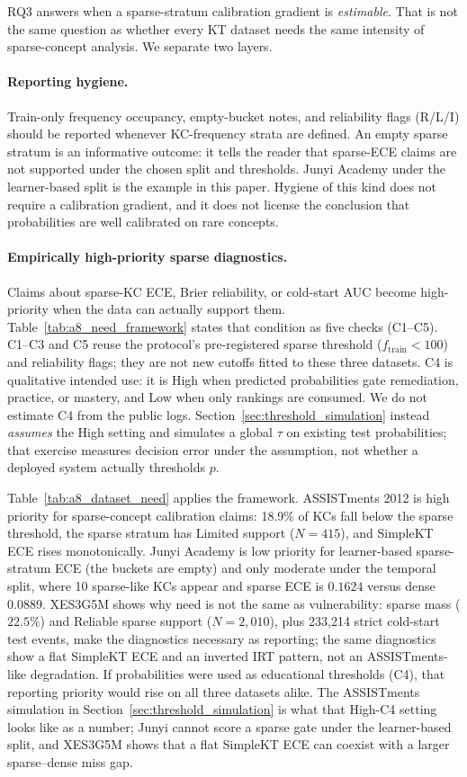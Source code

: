 RQ3 answers when a sparse-stratum calibration gradient is \emph{estimable}. That is not the same question as whether every KT dataset needs the same intensity of sparse-concept analysis. We separate two layers.

\paragraph{Reporting hygiene.}
Train-only frequency occupancy, empty-bucket notes, and reliability flags (R/L/I) should be reported whenever KC-frequency strata are defined. An empty sparse stratum is an informative outcome: it tells the reader that sparse-ECE claims are not supported under the chosen split and thresholds. Junyi Academy under the learner-based split is the example in this paper. Hygiene of this kind does not require a calibration gradient, and it does not license the conclusion that probabilities are well calibrated on rare concepts.

\paragraph{Empirically high-priority sparse diagnostics.}
Claims about sparse-KC ECE, Brier reliability, or cold-start AUC become high-priority when the data can actually support them. Table~\ref{tab:a8_need_framework} states that condition as five checks (C1--C5). C1--C3 and C5 reuse the protocol's pre-registered sparse threshold ($f_{\mathrm{train}}<100$) and reliability flags; they are not new cutoffs fitted to these three datasets. C4 is qualitative intended use: it is High when predicted probabilities gate remediation, practice, or mastery, and Low when only rankings are consumed. We do not estimate C4 from the public logs. Section~\ref{sec:threshold_simulation} instead \emph{assumes} the High setting and simulates a global $\tau$ on existing test probabilities; that exercise measures decision error under the assumption, not whether a deployed system actually thresholds $p$.

Table~\ref{tab:a8_dataset_need} applies the framework. ASSISTments 2012 is high priority for sparse-concept calibration claims: 18.9\% of KCs fall below the sparse threshold, the sparse stratum has Limited support ($N=415$), and SimpleKT ECE rises monotonically. Junyi Academy is low priority for learner-based sparse-stratum ECE (the buckets are empty) and only moderate under the temporal split, where 10 sparse-like KCs appear and sparse ECE is $0.1624$ versus dense $0.0889$. XES3G5M shows why need is not the same as vulnerability: sparse mass ($22.5\%$) and Reliable sparse support ($N=2{,}010$), plus 233{,}214 strict cold-start test events, make the diagnostics necessary as reporting; the same diagnostics show a flat SimpleKT ECE and an inverted IRT pattern, not an ASSISTments-like degradation. If probabilities were used as educational thresholds (C4), that reporting priority would rise on all three datasets alike. The ASSISTments simulation in Section~\ref{sec:threshold_simulation} is what that High-C4 setting looks like as a number; Junyi cannot score a sparse gate under the learner-based split, and XES3G5M shows that a flat SimpleKT ECE can coexist with a larger sparse--dense miss gap.

